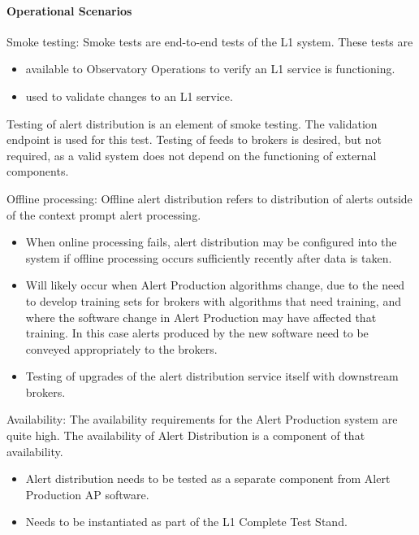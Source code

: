 \paragraph{Operational Scenarios}

Smoke testing:  Smoke tests are end-to-end tests of the L1 system. These tests are

\begin{itemize}

\item available to Observatory Operations to verify an L1 service is functioning.

\item used to validate changes to an L1 service.

\end{itemize}

Testing of alert distribution is an element of smoke testing. The validation endpoint is used for this test. Testing of feeds to brokers is desired, but not required, as a valid system does not depend on the functioning of external components.

Offline processing:  Offline alert distribution refers to distribution of alerts outside of the context prompt alert processing.

\begin{itemize}

\item When online processing fails, alert distribution may be configured into the system if offline processing occurs sufficiently recently after data is taken.

\item Will likely occur when Alert Production algorithms change, due to the need to develop training sets for brokers with algorithms that need training, and where the software change in Alert Production may have affected that training. In this case alerts produced by the new software need to be conveyed appropriately to the brokers.

\item Testing of upgrades of the alert distribution service itself with downstream brokers.

\end{itemize}

Availability: The availability requirements for the Alert Production system are quite high. The availability of Alert Distribution is a component of that availability.

\begin{itemize}

\item Alert distribution needs to be tested as a separate component from Alert Production AP software.

\item Needs to be instantiated as part of the L1 Complete Test Stand.

\end{itemize}

